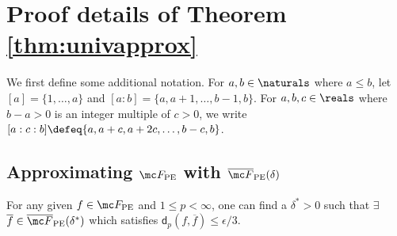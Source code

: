 \documentclass{article} %
\newcommand{\funcdist}{\mathsf{d}}
\begin{document}

\section{Proof details of Theorem \ref{thm:univapprox}}\label{sec:proof_main}
We first define some additional notation.
For $a, b \in \naturals$ where $a \leq b$, let $[a] = \{1, \dots, a\}$ and $[a:b] = \{a, a+1, \dots, b-1, b\}$.
For $a, b, c \in \reals$ where $b-a > 0$ is an integer multiple of $c > 0$, we write $[a:c:b] \defeq \{a, a+c, a+2c, \dots, b-c, b\}$.

\subsection{Approximating $\mc F_{\rm PE}$ with $\overline{\mc F}_{\rm PE}(\delta)$}
\label{appen:thm2-part1}

\begin{lemma}
\label{lemma:part1}
For any given $f \in \mc F_{\rm PE}$ and $1 \leq p < \infty$, one can find a $\delta^* > 0$ such that $\exists$ $\overline f \in \overline {\mc F}_{\rm PE} (\delta^*)$ which satisfies $\funcdist_p(f, \overline f) \leq \epsilon/3$.
\end{lemma}
\end{document}
